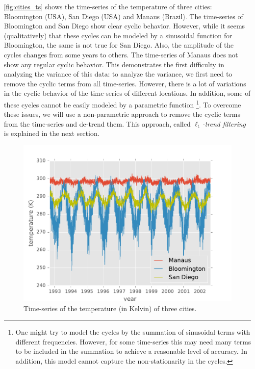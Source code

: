 \documentclass{article}
\begin{document}
\autoref{fig:cities_ts} shows the time-series of the temperature of three cities: Bloomington (USA), San Diego (USA) and Manaus (Brazil). The time-series of Bloomington and San Diego show clear cyclic behavior. However, while it seems (qualitatively) that these cycles can be modeled by a sinusoidal function for Bloomington, the same is not true for San Diego. Also, the amplitude of the cycles changes from some years to others. The time-series of Manaus does not show any regular cyclic behavior. This demonstrates the first difficulty in analyzing the variance of this data: to analyze the variance, we first need to remove the cyclic terms from all time-series. However, there is a lot of variations in the cyclic behavior of the time-series of different locations. In addition, some of these cycles cannot be easily modeled by a parametric function \footnote{One might try to model the cycles by the summation of sinusoidal terms with different frequencies. However, for some time-series this may need many terms to be included in the summation to achieve a reasonable level of accuracy. In addition, this model cannot capture the non-stationarity in the cycles.}. To overcome these issues, we will use a non-parametric approach to remove the cyclic terms from the time-series and de-trend them. This approach, called \textit{$\ell_1$-trend filtering} is explained in the next section.

\begin{figure}[ht]
	\vskip 0.2in
	\begin{center}
		\centerline{\includegraphics[width=\columnwidth]{Figures/cities_ts}}
		\caption{Time-series of the temperature (in Kelvin) of three cities.}
		\label{fig:cities_ts}
	\end{center}
	\vskip -0.2in
\end{figure} 
\end{document}
